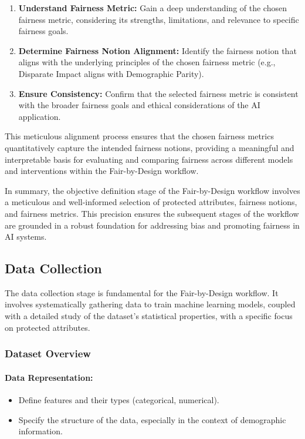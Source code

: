 \begin{enumerate}

    \item \textbf{Understand Fairness Metric:} Gain a deep understanding of the chosen fairness metric, considering its strengths, limitations, and relevance to specific fairness goals.

    \item \textbf{Determine Fairness Notion Alignment:} Identify the fairness notion that aligns with the underlying principles of the chosen fairness metric (e.g., Disparate Impact aligns with Demographic Parity).
 
    \item \textbf{Ensure Consistency:} Confirm that the selected fairness metric is consistent with the broader fairness goals and ethical considerations of the AI application.

\end{enumerate}

This meticulous alignment process ensures that the chosen fairness metrics quantitatively capture the intended fairness notions, providing a meaningful and interpretable basis for evaluating and comparing fairness across different models and interventions within the Fair-by-Design workflow.

In summary, the objective definition stage of the Fair-by-Design workflow involves a meticulous and well-informed selection of protected attributes, fairness notions, and fairness metrics. This precision ensures the subsequent stages of the workflow are grounded in a robust foundation for addressing bias and promoting fairness in AI systems.

\subsection{Data Collection}
\label{subsection:data_collection}

The data collection stage is fundamental for the Fair-by-Design workflow. It involves systematically gathering data to train machine learning models, coupled with a detailed study of the dataset's statistical properties, with a specific focus on protected attributes.

\subsubsection{Dataset Overview}

\paragraph{Data Representation:}
\begin{itemize}
    \item Define features and their types (categorical, numerical).
    \item Specify the structure of the data, especially in the context of demographic information.
\end{itemize}

